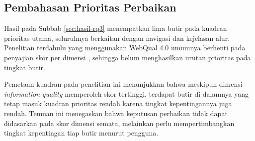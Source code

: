 \subsection{Pembahasan Prioritas Perbaikan}

Hasil pada Subbab \ref{sec:hasil-rq3} menempatkan lima butir pada kuadran
prioritas utama, seluruhnya berkaitan dengan navigasi dan kejelasan alur.
Penelitian terdahulu yang menggunakan WebQual 4.0 umumnya berhenti pada
penyajian skor per dimensi \citep{wijaya2022, pratama2023}, sehingga belum
menghasilkan urutan prioritas pada tingkat butir.

Pemetaan kuadran pada penelitian ini menunjukkan bahwa meskipun dimensi
\textit{information quality} memperoleh skor tertinggi, terdapat butir di
dalamnya yang tetap masuk kuadran prioritas rendah karena tingkat
kepentingannya juga rendah. Temuan ini menegaskan bahwa keputusan perbaikan
tidak dapat didasarkan pada skor dimensi semata, melainkan perlu
mempertimbangkan tingkat kepentingan tiap butir menurut pengguna.
